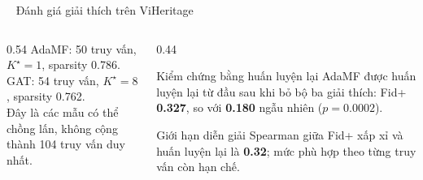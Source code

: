 \documentclass[aspectratio=169,10pt]{beamer}
\newcommand{\leveltag}[2]{%
  \tikz[baseline=(x.base)]{\node[fill=#1,text=white,inner xsep=5pt,inner ysep=1.5pt,
    rounded corners=2pt,font=\scriptsize\bfseries](x){#2};}\ %
}
\begin{document}
\begin{frame}{\leveltag{L3Aqua}{CẤP ĐỘ 3} Đánh giá giải thích trên ViHeritage}
  \begin{columns}[c]
    \begin{column}{0.54\textwidth}
      \centering
      \resizebox{0.98\linewidth}{!}{}
      {\scriptsize\color{Slate} AdaMF: 50 truy vấn, $K^\star=1$, sparsity 0.786.\\
      GAT: 54 truy vấn, $K^\star=8$, sparsity 0.762.\\
      Đây là các mẫu có thể chồng lấn, không cộng thành 104 truy vấn duy nhất.}
    \end{column}
    \begin{column}{0.44\textwidth}
      \begin{exampleblock}{Kiểm chứng bằng huấn luyện lại}\footnotesize
        AdaMF được huấn luyện lại từ đầu sau khi bỏ bộ ba giải thích: Fid+ \textbf{0.327}, so với \textbf{0.180} ngẫu nhiên ($p=0.0002$).
      \end{exampleblock}
      \begin{alertblock}{Giới hạn diễn giải}\footnotesize
        Spearman giữa Fid+ xấp xỉ và huấn luyện lại là \textbf{0.32}; mức phù hợp theo từng truy vấn còn hạn chế.\\[0.10cm]
      \end{alertblock}
    \end{column}
  \end{columns}
\end{frame}
\end{document}
